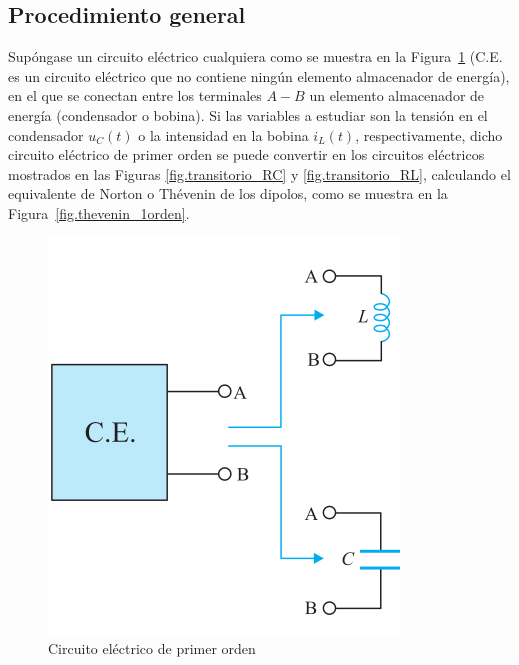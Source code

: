 
	
	
	
	
	
	
	
	
	\subsection{Procedimiento general}
	
	Supóngase un circuito eléctrico cualquiera como se muestra en la Figura~\ref{fig.CE_primerorden} (C.E. es un circuito eléctrico que no contiene ningún elemento almacenador de energía), en el que se conectan entre los terminales $A-B$ un elemento almacenador de energía (condensador o bobina). Si las variables a estudiar son la tensión en el condensador $u_C(t)$ o la intensidad en la bobina $i_L(t)$, respectivamente, dicho circuito eléctrico de primer orden se puede convertir en los circuitos eléctricos mostrados en las Figuras \ref{fig.transitorio_RC} y \ref{fig.transitorio_RL}, calculando el equivalente de Norton o Thévenin de los dipolos, como se muestra en la Figura~\ref{fig.thevenin_1orden}. 
	\begin{figure}[H]
	    \centering
	    \includegraphics[width=0.3\linewidth]{../figs/CE_primerorden.pdf}
	    \caption{Circuito eléctrico de primer orden}	    \label{fig.CE_primerorden}
	\end{figure}
	
